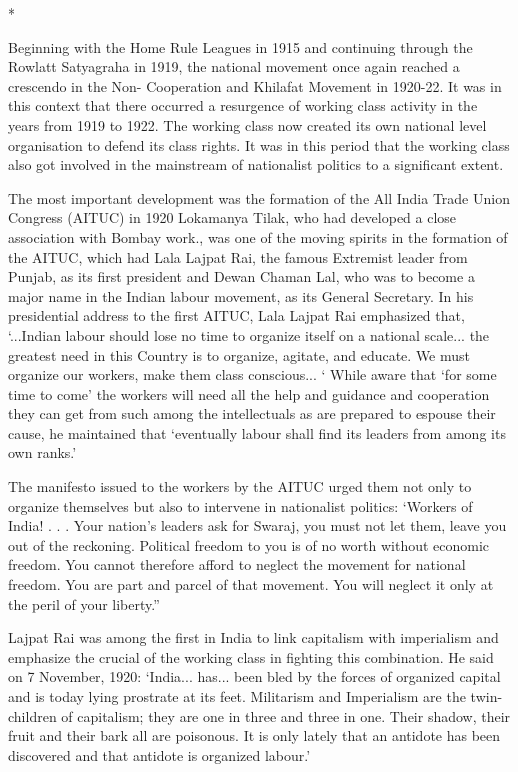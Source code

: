\begin{center}*\end{center}



Beginning with the Home Rule Leagues in 1915 and continuing through the Rowlatt Satyagraha in 1919, the national movement once again reached a crescendo in the Non- Cooperation and Khilafat Movement in 1920-22. It was in this context that there occurred a resurgence of working class activity in the years from 1919 to 1922. The working class now created its own national level organisation to defend its class rights. It was in this period that the working class also got involved in the mainstream of nationalist politics to a significant extent.

The most important development was the formation of the All India Trade Union Congress (AITUC) in 1920 Lokamanya Tilak, who had developed a close association with Bombay work., was one of the moving spirits in the formation of the AITUC, which had Lala Lajpat Rai, the famous Extremist leader from Punjab, as its first president and Dewan Chaman Lal, who was to become a major name in the Indian labour movement, as its General Secretary. In his presidential address to the first AITUC, Lala Lajpat Rai emphasized that, ‘...Indian labour should lose no time to organize itself on a national scale... the greatest need in this Country is to organize, agitate, and educate. We must organize our workers, make them class conscious... ‘ While aware that ‘for some time to come’ the workers will need all the help and guidance and cooperation they can get from such among the intellectuals as are prepared to espouse their cause, he maintained that ‘eventually labour shall find its leaders from among its own ranks.’

The manifesto issued to the workers by the AITUC urged them not only to organize themselves but also to intervene in nationalist politics: ‘Workers of India! . . . Your nation’s leaders ask for Swaraj, you must not let them, leave you out of the reckoning. Political freedom to you is of no worth without economic freedom. You cannot therefore afford to neglect the movement for national freedom. You are part and parcel of that movement. You will neglect it only at the peril of your liberty.”

Lajpat Rai was among the first in India to link capitalism with imperialism and emphasize the crucial of the working class in fighting this combination. He said on 7 November, 1920: ‘India... has... been bled by the forces of organized capital and is today lying prostrate at its feet. Militarism and Imperialism are the twin-children of capitalism; they are one in three and three in one. Their shadow, their fruit and their bark all are poisonous. It is only lately that an antidote has been discovered and that antidote is organized labour.’

